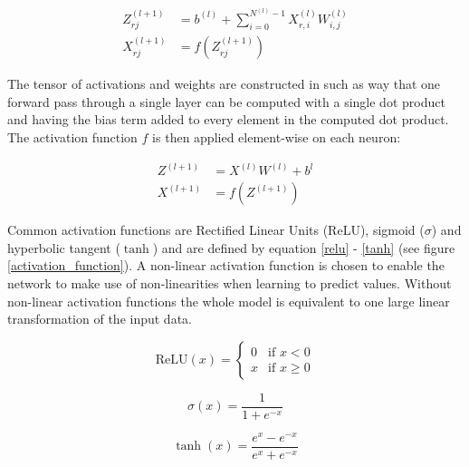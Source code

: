 \documentclass[a4paper,11pt,twoside]{article}
\begin{document}
\begin{align}
Z_{rj}^{(l+1)} & = b^{(l)} + \sum^{N^{(l)}-1}_{i = 0} X^{(l)}_{r,i} W^{(l)}_{i,j}\\
X_{rj}^{(l+1)} & = f(Z_{rj}^{(l+1)})
\end{align}

The tensor of activations and weights are constructed in such as way that one forward pass through a single layer can be computed with a single dot product and having the bias term added to every element in the computed dot product. The activation function $f$ is then applied element-wise on each neuron: \cite{cs231n} \cite{wikiStanford}

\begin{align}\label{feed-forward}
Z^{(l+1)} & = X^{(l)}W^{(l)}+b^{l}\\
X^{(l+1)} & = f(Z^{(l+1)})
\end{align}

Common activation functions are Rectified Linear Units (ReLU), sigmoid ($\sigma$) and hyperbolic tangent ($\tanh$) and are defined by equation \eqref{relu} - \eqref{tanh} (see figure \ref{activation_function}). A non-linear activation function is chosen to enable the network to make use of non-linearities when learning to predict values. Without non-linear activation functions the whole model is equivalent to one large linear transformation of the input data. \cite{cs231n}

\begin{equation}\label{relu}
\mbox{ReLU}{(x)} = \begin{cases} 
			0 & \mbox{if } x < 0 \\ 
			x & \mbox{if } x \geq 0 
		\end{cases}
\end{equation}

\begin{equation}\label{sigmoid}
\sigma(x) = \frac{1}{1+e^{-x}}
\end{equation}

\begin{equation}\label{tanh}
\tanh{(x)} = \frac{e^x-e^{-x}}{e^x+e^{-x}}
\end{equation}
\end{document}
